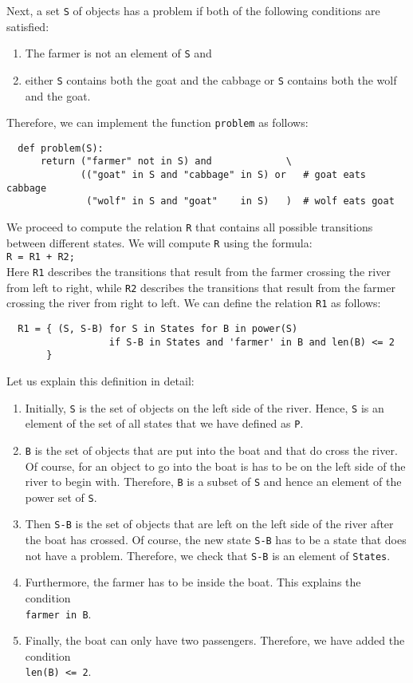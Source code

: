 Next, a set \texttt{S} of objects has a problem if both of the following conditions
are satisfied:
\begin{enumerate}
\item The farmer is not an element of \texttt{S} and
\item either \texttt{S} contains both the goat and the cabbage or \texttt{S} contains both the wolf and the goat.
\end{enumerate}
Therefore, we can implement the function \texttt{problem} as follows:
\begin{verbatim}
  def problem(S):
      return ("farmer" not in S) and             \
             (("goat" in S and "cabbage" in S) or   # goat eats cabbage
              ("wolf" in S and "goat"    in S)   )  # wolf eats goat
\end{verbatim}
We proceed to compute the relation \texttt{R} that contains all possible transitions between
different states.  We will compute \texttt{R} using the formula:
\\[0.2cm]
\hspace*{0.75cm}
\texttt{R = R1 + R2;}
\\[0.2cm]
Here \texttt{R1} describes the transitions that result from the farmer crossing the river from left
to right, while \texttt{R2} describes the transitions that result from the farmer crossing the river
from right to left.  We can define the relation \texttt{R1} as follows:
\begin{verbatim}
  R1 = { (S, S-B) for S in States for B in power(S)
                  if S-B in States and 'farmer' in B and len(B) <= 2
       }
\end{verbatim}
Let us explain this definition in detail:
\begin{enumerate}
\item Initially, \texttt{S} is the set of objects on the left side of the river.  Hence, \texttt{S}
      is an element of the set of all states that we have defined as \texttt{P}.
\item \texttt{B} is the set of objects that are put into the boat and that do cross the river.  Of
      course, for an object to go into the boat is has to be on the left side of the river to begin
      with.  Therefore, \texttt{B} is a subset of \texttt{S} and hence an element of the power set
      of \texttt{S}. 
\item Then  \texttt{S-B} is the set of objects that are left on the left side of the river after
      the boat has crossed.  Of course, the new state \texttt{S-B} has to be a state that does not
      have a problem.  Therefore, we check that \texttt{S-B} is an element of \texttt{States}.
\item Furthermore, the farmer has to be inside the boat.  This explains the condition 
      \\[0.2cm]
      \hspace*{1.3cm}
      \texttt{farmer in B}.
\item Finally, the boat can only have two passengers.  Therefore, we have added the condition
      \\[0.2cm]
      \hspace*{1.3cm}
      \texttt{len(B) <= 2}.
\end{enumerate}

